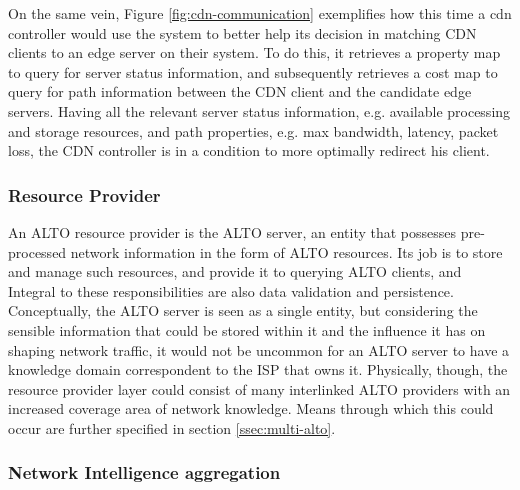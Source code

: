     On the same vein, Figure \ref{fig:cdn-communication} exemplifies how this time a cdn controller would use the system to better help its decision in matching CDN clients to an edge server on their system.
    To do this, it retrieves a property map to query for server status information, and subsequently retrieves a cost map to query for path information between the CDN client and the candidate edge servers.
    Having all the relevant server status information, e.g. available processing and storage resources, and path properties, e.g. max bandwidth, latency, packet loss, the CDN controller is in a condition to more optimally redirect his client.

\subsubsection{Resource Provider}

    An ALTO resource provider is the ALTO server, an entity that possesses pre-processed network information in the form of ALTO resources.
    Its job is to store and manage such resources, and provide it to querying ALTO clients, and Integral to these responsibilities are also data validation and persistence.
    Conceptually, the ALTO server is seen as a single entity, but considering the sensible information that could be stored within it and the influence it has on shaping network traffic, it would not be uncommon for an ALTO server to have a knowledge domain correspondent to the ISP that owns it.
    Physically, though, the resource provider layer could consist of many interlinked ALTO providers with an increased coverage area of network knowledge.
    Means through which this could occur are further specified in section \ref{ssec:multi-alto}.

\subsubsection{Network Intelligence aggregation}

